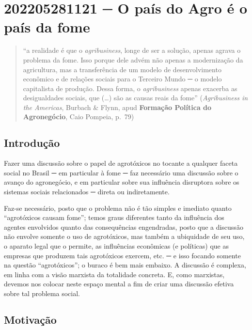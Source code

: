 \hypertarget{o-pauxeds-do-agro-uxe9-o-pauxeds-da-fome}{%
\section{202205281121 ─ O país do Agro é o país da
fome}\label{o-pauxeds-do-agro-uxe9-o-pauxeds-da-fome}}

\begin{quote}
``a realidade é que o \textit{agribusiness}, longe de ser a solução,
apenas agrava o problema da fome. Isso porque dele advém não apenas a
modernização da agricultura, mas a transferência de um modelo de
desenvolvimento econômico e de relações sociais para o Terceiro Mundo ─
o modelo capitalista de produção. Dessa forma, o \textit{agribusiness}
apenas exacerba as desigualdades sociais, que (\ldots) são as causas
reais da fome'' (\textit{Agribusiness in the Americas}, Burbach \&
Flynn, apud \textbf{Formação Política do Agronegócio}, Caio Pompeia,
p.~79)
\end{quote}

\hypertarget{introduuxe7uxe3o}{%
\subsection{Introdução}\label{introduuxe7uxe3o}}

Fazer uma discussão sobre o papel de agrotóxicos no tocante a qualquer
faceta social no Brasil ─ em particular à fome ─ faz necessário uma
discussão sobre o avanço do agronegócio, e em particular sobre sua
influência disruptora sobre os sistemas sociais relacionados ─ direta ou
indiretamente.

Faz-se necessário, posto que o problema não é tão simples e imediato
quanto ``agrotóxicos causam fome''; temos graus diferentes tanto da
influência dos agentes envolvidos quanto das consequências engendradas,
posto que a discussão não envolve somente o uso de agrotóxicos, mas
também a ubiquidade de seu uso, o aparato legal que o permite, as
influências econômicas (e políticas) que as empresas que produzem tais
agrotóxicos exercem, etc. ─ e isso focando somente na questão
``agrotóxicos''; o buraco é bem mais embaixo. A discussão é complexa, em
linha com a visão marxista da totalidade concreta. E, como marxistas,
devemos nos colocar neste espaço mental a fim de criar uma discussão
efetiva sobre tal problema social.

\hypertarget{motivauxe7uxe3o}{%
\subsection{Motivação}\label{motivauxe7uxe3o}}

